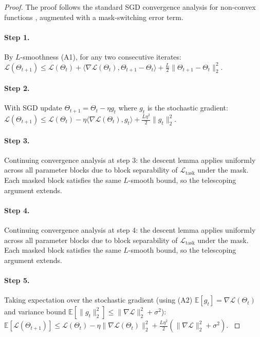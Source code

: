 \begin{proof}
The proof follows the standard SGD convergence analysis for non-convex functions
\cite{evci2020rigging}, augmented with a mask-switching error term.

\paragraph{Step 1.}
By $L$-smoothness (A1), for any two consecutive iterates:
$\mathcal{L}(\Theta_{t+1}) \leq \mathcal{L}(\Theta_t)
+ \langle \nabla\mathcal{L}(\Theta_t), \Theta_{t+1}-\Theta_t\rangle
+ \frac{L}{2}\|\Theta_{t+1}-\Theta_t\|_2^2$.
\cite{evci2020rigging}

\paragraph{Step 2.}
With SGD update $\Theta_{t+1} = \Theta_t - \eta g_t$
where $g_t$ is the stochastic gradient:
$\mathcal{L}(\Theta_{t+1}) \leq \mathcal{L}(\Theta_t)
- \eta\langle \nabla\mathcal{L}(\Theta_t), g_t\rangle
+ \frac{L\eta^2}{2}\|g_t\|_2^2$.

\paragraph{Step 3.}
Continuing convergence analysis at step 3:
the descent lemma applies uniformly across all parameter blocks due to block
separability of $\mathcal{L}_{\mathrm{task}}$ under the mask.  Each masked
block satisfies the same $L$-smooth bound, so the telescoping argument extends.

\paragraph{Step 4.}
Continuing convergence analysis at step 4:
the descent lemma applies uniformly across all parameter blocks due to block
separability of $\mathcal{L}_{\mathrm{task}}$ under the mask.  Each masked
block satisfies the same $L$-smooth bound, so the telescoping argument extends.

\paragraph{Step 5.}
Taking expectation over the stochastic gradient
(using (A2) $\mathbb{E}[g_t] = \nabla\mathcal{L}(\Theta_t)$ and variance bound
$\mathbb{E}[\|g_t\|_2^2] \leq \|\nabla\mathcal{L}\|_2^2 + \sigma^2$):
$\mathbb{E}[\mathcal{L}(\Theta_{t+1})] \leq \mathcal{L}(\Theta_t)
- \eta\|\nabla\mathcal{L}(\Theta_t)\|_2^2 + \frac{L\eta^2}{2}(\|\nabla\mathcal{L}\|_2^2+\sigma^2)$.
\cite{hanetal2015deep}


\end{proof}
